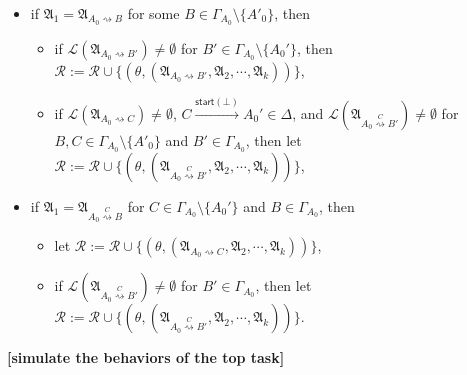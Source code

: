 \documentclass[preprint,12pt]{elsarticle}
\newcommand\act{{\sf Act}}
\newcommand\startactivity{{\mathsf{start} }}
\newcommand\post{{\mathsf{post} }}
\newcommand\AutReach{\mathscr{R}}
\newcommand{\STK}{\mathsf{STK}}
\newcommand\Aut{{\mathfrak{A} }}
\newcommand\Lang{{\mathscr{L} }}
\newcommand\ConfSet{{\mathscr{C} }}
\begin{document}
{\begin{minipage}{\textwidth}
{\begin{enumerate}
\begin{itemize}
      \item if  $\Aut_1 = \Aut_{A_0\rightsquigarrow B}$ for some $B \in \Gamma_{A_0} \setminus \{A'_0\}$, then
      \begin{itemize}
      \item if $\Lang(\Aut_{A_0\rightsquigarrow B'}) \neq \emptyset$ for $B' \in \Gamma_{A_0}\setminus\{A_0'\}$, then $\AutReach := \AutReach \cup \{(\theta, (\Aut_{A_0 \rightsquigarrow B'}, \Aut_2,\cdots,\Aut_k))\}$,
      \item if $\Lang(\Aut_{A_0 \rightsquigarrow C}) \neq \emptyset$, $C \xrightarrow[]{\startactivity(\bot)} A_0' \in \Delta$, and $\Lang(\Aut_{A_0 \stackrel{C}{\rightsquigarrow} B'}) \neq \emptyset$ for $B, C \in \Gamma_{A_0} \setminus \{A'_0\}$ and $B' \in \Gamma_{A_0}$, then let $\AutReach := \AutReach \cup \{(\theta, (\Aut_{A_0\stackrel{C}\rightsquigarrow B'}, \Aut_2,\cdots,\Aut_k))\}$,
      \end{itemize}
        \item if $\Aut_1 = \Aut_{A_0\stackrel{C}\rightsquigarrow B}$ for $C \in\Gamma_{A_0}\setminus\{A_0'\}$ and $B \in \Gamma_{A_0}$, then 
        \begin{itemize}
        \item let $\AutReach := \AutReach \cup \{(\theta, (\Aut_{A_0\rightsquigarrow C}, \Aut_2,\cdots,\Aut_k))\}$, 
       \item if $\Lang(\Aut_{A_0 \stackrel{C}{\rightsquigarrow} B'}) \neq \emptyset$ for $B' \in \Gamma_{A_0}$, then let $\AutReach := \AutReach \cup \{(\theta, (\Aut_{A_0\stackrel{C}{\rightsquigarrow} B'}, \Aut_2,\cdots,\Aut_k))\}$.
       \end{itemize}
    \end{itemize}
        \textbf{[simulate the behaviors of the top task]}
\end{enumerate}
}
\end{minipage}
}
\end{document}
